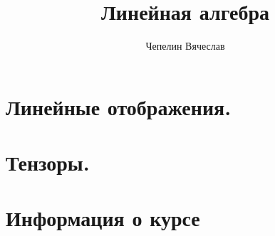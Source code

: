 \documentclass{article}
\title{Линейная алгебра}
\author{Чепелин Вячеслав}
\date{}
\begin{document}
\maketitle
\tableofcontents
\newpage
\section{Линейные отображения.}

\newpage
\section{Тензоры.}



\newpage
\section{Информация о курсе}

\end{document}
